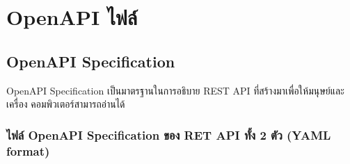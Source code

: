 \chapter{OpenAPI ไฟล์}
\label{appB}



\section{OpenAPI Specification}
OpenAPI Specification เป็นมาตรฐานในการอธิบาย REST API ที่สร้างมาเพื่อให้มนุษย์และเครื่อง
คอมพิวเตอร์สามารถอ่านได้
\subsection{ไฟล์ OpenAPI Specification ของ RET API ทั้ง 2 ตัว (YAML format)}

